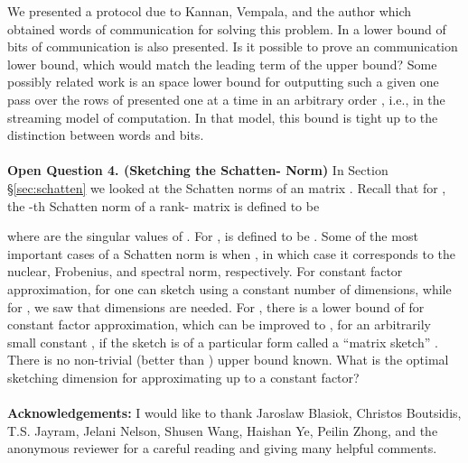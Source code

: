 \documentclass[11pt]{article}
\begin{document}
We presented a protocol due to Kannan, Vempala, and the author
\cite{kvw14} 
which obtained  words of communication
for solving this problem. In \cite{kvw14} a lower bound of  bits
of communication is also presented. Is it possible to prove an 
 communication 
lower bound, which would match the leading term of the
upper bound? Some possibly related work is an  
space lower bound 
for outputting such a  given one pass over the rows of 
presented one at a time in an arbitrary order \cite{w14}, i.e., in the
streaming model of computation. In that model, this bound is
tight up to the distinction between words and bits. 
\\\\
{\bf Open Question 4. (Sketching the Schatten- Norm)}
In Section \S\ref{sec:schatten} we looked at the Schatten norms of an
 matrix
. Recall that for , 
the -th Schatten norm  of a rank- matrix  is 
defined to be 

where  
are the singular values of . For
,  is defined to be .
Some of the
most important cases of a Schatten norm is when , 
in which case it corresponds to the nuclear, Frobenius, and spectral norm,
respectively. For constant factor approximation, 
for  one can sketch  using a constant number
of dimensions, while for , we saw that  dimensions 
are needed. For , there is a lower bound of  for
constant factor approximation, which can be improved to ,
for an arbitrarily small constant , 
if the sketch is of a particular form called a ``matrix sketch'' 
\cite{lnw14}. There is no non-trivial (better than ) upper bound
known. What is the optimal sketching dimension for approximating
 up to a constant factor?
\\\\
{\bf Acknowledgements:} 
I would like to thank Jaroslaw Blasiok, Christos Boutsidis, 
T.S. Jayram, Jelani Nelson, Shusen Wang, Haishan Ye, Peilin Zhong,  
and the anonymous
reviewer for a careful reading and giving many helpful comments. 




\end{document}
